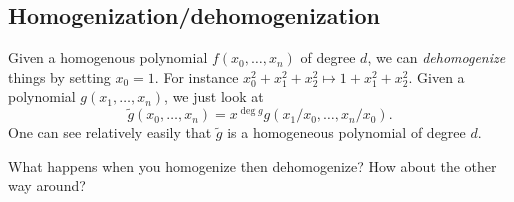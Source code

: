 \documentclass[12pt]{article}
\begin{document}
\subsection{Homogenization/dehomogenization}
Given a homogenous polynomial $f(x_0,\dots,x_n)$ of degree $d$, we can \textit{dehomogenize} things by setting $x_0=1$. For instance $x_0^2+x_1^2+x_2^2\mapsto 1+x_1^2+x_2^2$.
Given a polynomial $g(x_1,\dots,x_n)$, we just look at 
\[\tilde g(x_0,\dots,x_n)=x^{\deg g}g(x_1/x_0,\dots,x_n/x_0).\]
One can see relatively easily that $\tilde g$ is a homogeneous polynomial of degree $d$.

\begin{prob}
	What happens when you homogenize then dehomogenize? How about the other way around?
\end{prob}
\end{document}
